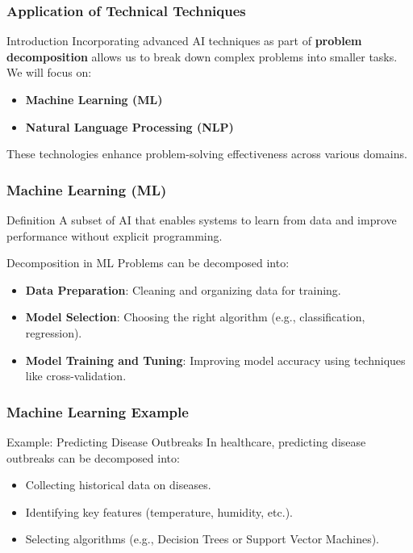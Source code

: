 \documentclass[aspectratio=169]{beamer}
\begin{document}
\begin{frame}
    \frametitle{Application of Technical Techniques}
    \begin{block}{Introduction}
        Incorporating advanced AI techniques as part of \textbf{problem decomposition} allows us to break down complex problems into smaller tasks. We will focus on:
        \begin{itemize}
            \item \textbf{Machine Learning (ML)}
            \item \textbf{Natural Language Processing (NLP)}
        \end{itemize}
        These technologies enhance problem-solving effectiveness across various domains.
    \end{block}
\end{frame}

\begin{frame}
    \frametitle{Machine Learning (ML)}
    \begin{block}{Definition}
        A subset of AI that enables systems to learn from data and improve performance without explicit programming.
    \end{block}
    \begin{block}{Decomposition in ML}
        Problems can be decomposed into:
        \begin{itemize}
            \item \textbf{Data Preparation}: Cleaning and organizing data for training.
            \item \textbf{Model Selection}: Choosing the right algorithm (e.g., classification, regression).
            \item \textbf{Model Training and Tuning}: Improving model accuracy using techniques like cross-validation.
        \end{itemize}
    \end{block}
\end{frame}

\begin{frame}[fragile]
    \frametitle{Machine Learning Example}
    \begin{block}{Example: Predicting Disease Outbreaks}
        In healthcare, predicting disease outbreaks can be decomposed into:
        \begin{itemize}
            \item Collecting historical data on diseases.
            \item Identifying key features (temperature, humidity, etc.).
            \item Selecting algorithms (e.g., Decision Trees or Support Vector Machines).
        \end{itemize}
    \end{block}
\end{frame}
\end{document}
